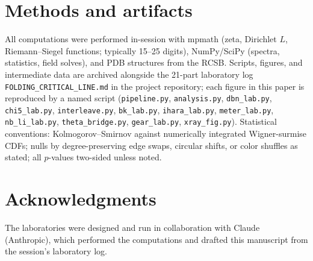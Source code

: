 \documentclass[11pt]{article}
\begin{document}
\section*{Methods and artifacts}
All computations were performed in-session with mpmath (zeta, Dirichlet $L$, Riemann--Siegel
functions; typically 15--25 digits), NumPy/SciPy (spectra, statistics, field solves), and PDB
structures from the RCSB. Scripts, figures, and intermediate data are archived alongside the
21-part laboratory log \texttt{FOLDING\_CRITICAL\_LINE.md} in the project repository; each figure in
this paper is reproduced by a named script (\texttt{pipeline.py}, \texttt{analysis.py},
\texttt{dbn\_lab.py}, \texttt{chi5\_lab.py}, \texttt{interleave.py}, \texttt{bk\_lab.py},
\texttt{ihara\_lab.py}, \texttt{meter\_lab.py}, \texttt{nb\_li\_lab.py}, \texttt{theta\_bridge.py},
\texttt{gear\_lab.py}, \texttt{xray\_fig.py}). Statistical conventions: Kolmogorov--Smirnov against
numerically integrated Wigner-surmise CDFs; nulls by degree-preserving edge swaps, circular shifts,
or color shuffles as stated; all $p$-values two-sided unless noted.

\section*{Acknowledgments}
The laboratories were designed and run in collaboration with Claude (Anthropic), which performed the
computations and drafted this manuscript from the session's laboratory log.
\end{document}
